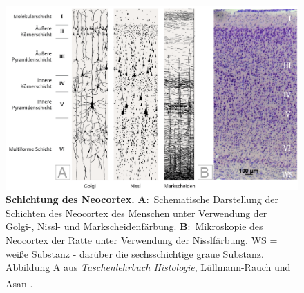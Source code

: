 \documentclass[12pt,a4paper,pdftex]{article}
\begin{document}
\begin{figure}[H]
	\centering
	\includegraphics[width=\textwidth]{pictures/Bilder_Jule/Andere/neocortex_schichtung.png}
	\caption[Schichtung des Neocortex]{\textbf{Schichtung des Neocortex.} \textbf{A}:~Schematische Darstellung der Schichten des Neocortex des Menschen unter Verwendung der Golgi-, Nissl- und Markscheidenfärbung. \textbf{B}:~Mikroskopie des Neocortex der Ratte unter Verwendung der Nisslfärbung. WS = weiße Substanz - darüber die sechsschichtige graue Substanz.\\
	Abbildung A aus \textit{Taschenlehrbuch Histologie}, Lüllmann-Rauch und Asan \textsuperscript{\cite{taschenbuch_histologie}}.}
	\label{fig:neoccortex_schichtung}
\end{figure}
\end{document}
